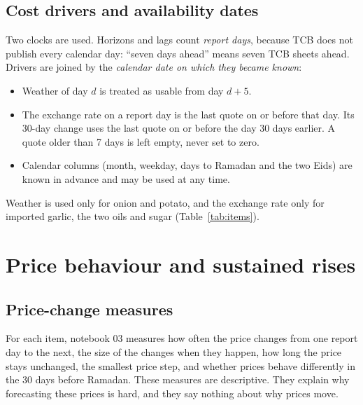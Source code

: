 \subsection{Cost drivers and availability dates}\label{sec:avail}
Two clocks are used. Horizons and lags count \emph{report days}, because TCB does not publish every calendar day: ``seven days ahead'' means seven TCB sheets ahead. Drivers are joined by the \emph{calendar date on which they became known}:
\begin{itemize}[leftmargin=*,itemsep=2pt]
\item Weather of day $d$ is treated as usable from day $d+5$.
\item The exchange rate on a report day is the last quote on or before that day. Its 30-day change uses the last quote on or before the day 30 days earlier. A quote older than 7 days is left empty, never set to zero.
\item Calendar columns (month, weekday, days to Ramadan and the two Eids) are known in advance and may be used at any time.
\end{itemize}
Weather is used only for onion and potato, and the exchange rate only for imported garlic, the two oils and sugar (Table~\ref{tab:items}).

\section{Price behaviour and sustained rises}\label{sec:method-behaviour}

\subsection{Price-change measures}
For each item, notebook 03 measures how often the price changes from one report day to the next, the size of the changes when they happen, how long the price stays unchanged, the smallest price step, and whether prices behave differently in the 30 days before Ramadan. These measures are descriptive. They explain why forecasting these prices is hard, and they say nothing about why prices move.

